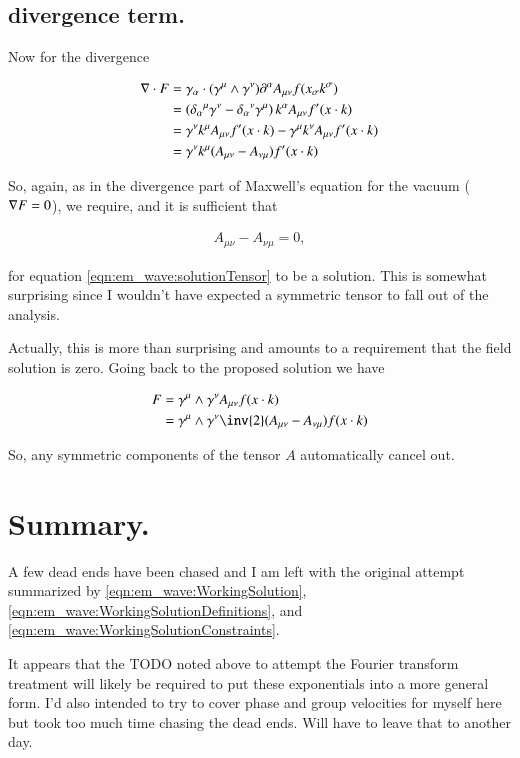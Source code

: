 \subsection{divergence term. }

Now for the divergence 

\begin{align*}
\nabla \cdot F 
&= \gamma_\alpha \cdot (\gamma^\mu \wedge \gamma^\nu) \partial^\alpha A_{\mu\nu} f( x_\sigma k^\sigma ) \\
&= \left( {\delta_\alpha}^\mu \gamma^\nu -{\delta_\alpha}^\nu \gamma^\mu \right) k^\alpha A_{\mu\nu} f'( x \cdot k ) \\
&= 
 \gamma^\nu k^\mu A_{\mu\nu} f'( x \cdot k ) 
-\gamma^\mu k^\nu A_{\mu\nu} f'( x \cdot k ) 
\\
&= \gamma^\nu k^\mu (A_{\mu\nu} -A_{\nu\mu}) f'( x \cdot k ) 
\end{align*}

So, again, as in the divergence part of Maxwell's equation for the vacuum ($\nabla F = 0$), we require, and it is sufficient that

\begin{align*}
A_{\mu\nu} -A_{\nu\mu} = 0,
\end{align*}

for equation \ref{eqn:em_wave:solutionTensor} to be a solution.  This is somewhat surprising since I wouldn't have expected a symmetric tensor to fall out of
the analysis.

Actually, this is more than surprising and amounts to a requirement that the field solution is zero.  Going back to the proposed solution we have

\begin{align*}
F 
&= \gamma^\mu \wedge \gamma^\nu A_{\mu\nu} f( x \cdot k ) \\
&= \gamma^\mu \wedge \gamma^\nu \inv{2} (A_{\mu\nu} - A_{\nu\mu})f( x \cdot k ) \\
\end{align*}

So, any symmetric components of the tensor $A$ automatically cancel out.

\section{Summary. }

A few dead ends have been chased and I am left with the original attempt summarized by 
\ref{eqn:em_wave:WorkingSolution},
\ref{eqn:em_wave:WorkingSolutionDefinitions}, and
\ref{eqn:em_wave:WorkingSolutionConstraints}.  

It appears that the TODO noted above to attempt the Fourier transform treatment will likely be required to put these exponentials into a more general form.
I'd also intended to try to cover phase and group velocities for myself here but took too much time chasing the dead ends.  Will have to leave that
to another day.
